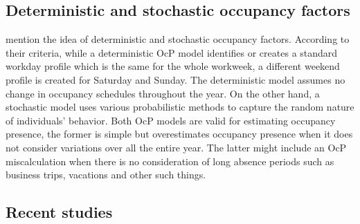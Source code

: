 \subsection{Deterministic and stochastic occupancy factors}
       
\citeauthor{duarte2013revealing} \cite{duarte2013revealing} mention the idea of deterministic and stochastic occupancy factors. According to their criteria, while a deterministic OcP model identifies or creates a standard workday profile which is the same for the whole workweek, a different weekend profile is created for Saturday and Sunday. The deterministic model assumes no change in occupancy schedules throughout the year. On the other hand, a stochastic model uses various probabilistic methods to capture the random nature of individuals’ behavior. Both OcP models are valid for estimating occupancy presence, the former is simple but overestimates occupancy presence when it does not consider variations over all the entire year. The latter might include an OcP miscalculation when there is no consideration of long absence periods such as business trips, vacations and other such things.\\
  

\subsection{Recent studies}

